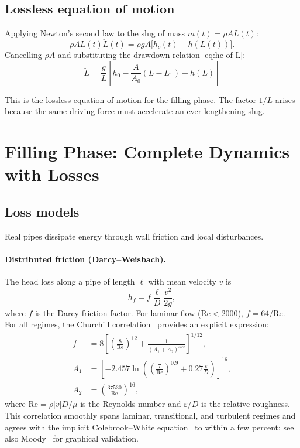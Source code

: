 \documentclass[11pt]{article}
\theoremstyle{definition}
\begin{document}
\subsection{Lossless equation of motion}

Applying Newton's second law to the slug of mass $m(t) = \rho A L(t)$:
\[
  \rho A L(t) \ddot{L}(t) = \rho g A \bigl[h_c(t) - h(L(t))\bigr].
\]
Cancelling $\rho A$ and substituting the drawdown relation \eqref{eq:hc-of-L}:
\begin{equation}
  \boxed{\ddot{L} = \frac{g}{L}\left[h_0 - \frac{A}{A_0}(L - L_1) - h(L)\right]}
  \label{eq:lossless-EOM}
\end{equation}

This is the lossless equation of motion for the filling phase. The factor $1/L$ arises 
because the same driving force must accelerate an ever-lengthening slug.

\section{Filling Phase: Complete Dynamics with Losses}
\label{sec:filling}

\subsection{Loss models}

Real pipes dissipate energy through wall friction and local disturbances.

\paragraph{Distributed friction (Darcy--Weisbach).}
The head loss along a pipe of length $\ell$ with mean velocity $v$ is
\[
  h_f = f \frac{\ell}{D} \frac{v^2}{2g},
\]
where $f$ is the Darcy friction factor. For laminar flow ($\text{Re} < 2000$), 
$f = 64/\text{Re}$. For all regimes, the Churchill correlation~\cite{churchill} provides 
an explicit expression:
\begin{align}
  f &= 8\left[\left(\frac{8}{\text{Re}}\right)^{12} 
       + \frac{1}{(A_1 + A_2)^{3/2}}\right]^{1/12}, \label{eq:churchill-f} \\
  A_1 &= \left[-2.457 \ln\left(\left(\frac{7}{\text{Re}}\right)^{0.9} 
         + 0.27\frac{\varepsilon}{D}\right)\right]^{16}, \label{eq:churchill-A1} \\
  A_2 &= \left(\frac{37530}{\text{Re}}\right)^{16}, \label{eq:churchill-A2}
\end{align}
where $\text{Re} = \rho |v| D / \mu$ is the Reynolds number and $\varepsilon/D$ is the 
relative roughness. This correlation smoothly spans laminar, transitional, and turbulent 
regimes and agrees with the implicit Colebrook--White equation~\cite{colebrook} to within 
a few percent; see also Moody~\cite{moody} for graphical validation.
\end{document}

